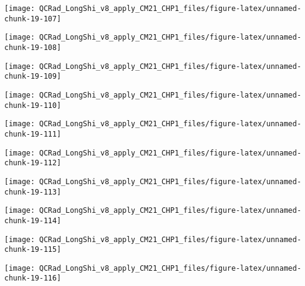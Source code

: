 \documentclass[
  10pt,
  a4paper,oneside]{article}
\begin{document}
\begin{center}\texttt{[image: QCRad\_LongShi\_v8\_apply\_CM21\_CHP1\_files/figure-latex/unnamed-chunk-19-107]} \end{center}

\begin{center}\texttt{[image: QCRad\_LongShi\_v8\_apply\_CM21\_CHP1\_files/figure-latex/unnamed-chunk-19-108]} \end{center}

\begin{center}\texttt{[image: QCRad\_LongShi\_v8\_apply\_CM21\_CHP1\_files/figure-latex/unnamed-chunk-19-109]} \end{center}

\begin{center}\texttt{[image: QCRad\_LongShi\_v8\_apply\_CM21\_CHP1\_files/figure-latex/unnamed-chunk-19-110]} \end{center}

\begin{center}\texttt{[image: QCRad\_LongShi\_v8\_apply\_CM21\_CHP1\_files/figure-latex/unnamed-chunk-19-111]} \end{center}

\begin{center}\texttt{[image: QCRad\_LongShi\_v8\_apply\_CM21\_CHP1\_files/figure-latex/unnamed-chunk-19-112]} \end{center}

\begin{center}\texttt{[image: QCRad\_LongShi\_v8\_apply\_CM21\_CHP1\_files/figure-latex/unnamed-chunk-19-113]} \end{center}

\begin{center}\texttt{[image: QCRad\_LongShi\_v8\_apply\_CM21\_CHP1\_files/figure-latex/unnamed-chunk-19-114]} \end{center}

\begin{center}\texttt{[image: QCRad\_LongShi\_v8\_apply\_CM21\_CHP1\_files/figure-latex/unnamed-chunk-19-115]} \end{center}

\begin{center}\texttt{[image: QCRad\_LongShi\_v8\_apply\_CM21\_CHP1\_files/figure-latex/unnamed-chunk-19-116]} \end{center}
\end{document}

